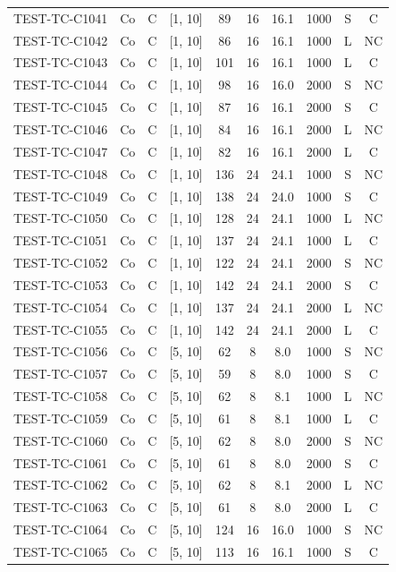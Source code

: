 \begin{longtable}{lccccccccc}
TEST-TC-C1041 & Co & C & [1, 10] & 89 & 16 & 16.1 & 1000 & S & C \\
TEST-TC-C1042 & Co & C & [1, 10] & 86 & 16 & 16.1 & 1000 & L & NC \\
TEST-TC-C1043 & Co & C & [1, 10] & 101 & 16 & 16.1 & 1000 & L & C \\
TEST-TC-C1044 & Co & C & [1, 10] & 98 & 16 & 16.0 & 2000 & S & NC \\
TEST-TC-C1045 & Co & C & [1, 10] & 87 & 16 & 16.1 & 2000 & S & C \\
TEST-TC-C1046 & Co & C & [1, 10] & 84 & 16 & 16.1 & 2000 & L & NC \\
TEST-TC-C1047 & Co & C & [1, 10] & 82 & 16 & 16.1 & 2000 & L & C \\
TEST-TC-C1048 & Co & C & [1, 10] & 136 & 24 & 24.1 & 1000 & S & NC \\
TEST-TC-C1049 & Co & C & [1, 10] & 138 & 24 & 24.0 & 1000 & S & C \\
TEST-TC-C1050 & Co & C & [1, 10] & 128 & 24 & 24.1 & 1000 & L & NC \\
TEST-TC-C1051 & Co & C & [1, 10] & 137 & 24 & 24.1 & 1000 & L & C \\
TEST-TC-C1052 & Co & C & [1, 10] & 122 & 24 & 24.1 & 2000 & S & NC \\
TEST-TC-C1053 & Co & C & [1, 10] & 142 & 24 & 24.1 & 2000 & S & C \\
TEST-TC-C1054 & Co & C & [1, 10] & 137 & 24 & 24.1 & 2000 & L & NC \\
TEST-TC-C1055 & Co & C & [1, 10] & 142 & 24 & 24.1 & 2000 & L & C \\
TEST-TC-C1056 & Co & C & [5, 10] & 62 & 8 & 8.0 & 1000 & S & NC \\
TEST-TC-C1057 & Co & C & [5, 10] & 59 & 8 & 8.0 & 1000 & S & C \\
TEST-TC-C1058 & Co & C & [5, 10] & 62 & 8 & 8.1 & 1000 & L & NC \\
TEST-TC-C1059 & Co & C & [5, 10] & 61 & 8 & 8.1 & 1000 & L & C \\
TEST-TC-C1060 & Co & C & [5, 10] & 62 & 8 & 8.0 & 2000 & S & NC \\
TEST-TC-C1061 & Co & C & [5, 10] & 61 & 8 & 8.0 & 2000 & S & C \\
TEST-TC-C1062 & Co & C & [5, 10] & 62 & 8 & 8.1 & 2000 & L & NC \\
TEST-TC-C1063 & Co & C & [5, 10] & 61 & 8 & 8.0 & 2000 & L & C \\
TEST-TC-C1064 & Co & C & [5, 10] & 124 & 16 & 16.0 & 1000 & S & NC \\
TEST-TC-C1065 & Co & C & [5, 10] & 113 & 16 & 16.1 & 1000 & S & C \\

\end{longtable}
